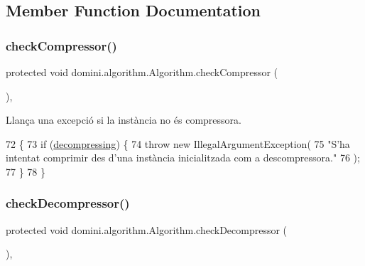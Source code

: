\subsection{Member Function Documentation}
\mbox{\label{classdomini_1_1algorithm_1_1Algorithm_a070b7e7dcc453b03751d265beae5306c}} 
\subsubsection{\texorpdfstring{check\+Compressor()}{checkCompressor()}}
{\footnotesize\ttfamily protected void domini.\+algorithm.\+Algorithm.\+check\+Compressor (\begin{DoxyParamCaption}{ }\end{DoxyParamCaption})\hspace{0.3cm}{\ttfamily [inline]}, {\ttfamily [protected]}}



Llança una excepció si la instància no és compressora. 


\begin{DoxyCode}
72                                      \{
73         \textcolor{keywordflow}{if} (\hyperlink{classdomini_1_1algorithm_1_1Algorithm_a0ec73147fb68a16e53801ea5da35b089}{decompressing}) \{
74             \textcolor{keywordflow}{throw} \textcolor{keyword}{new} IllegalArgumentException(
75                 \textcolor{stringliteral}{"S'ha intentat comprimir des d'una instància inicialitzada com a descompressora."}
76             );
77         \}
78     \}
\end{DoxyCode}
\mbox{\label{classdomini_1_1algorithm_1_1Algorithm_a6b738342cc7169893fa60d593f5a13db}} 
\subsubsection{\texorpdfstring{check\+Decompressor()}{checkDecompressor()}}
{\footnotesize\ttfamily protected void domini.\+algorithm.\+Algorithm.\+check\+Decompressor (\begin{DoxyParamCaption}{ }\end{DoxyParamCaption})\hspace{0.3cm}{\ttfamily [inline]}, {\ttfamily [protected]}}



